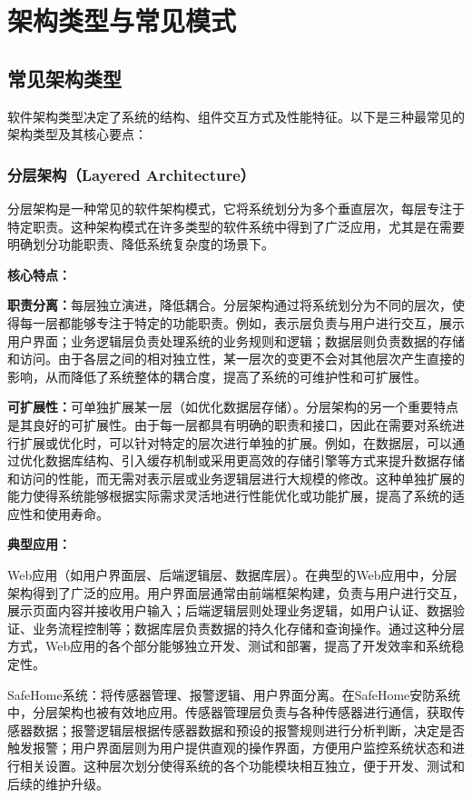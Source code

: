 \section{架构类型与常见模式}

\subsection{常见架构类型}

软件架构类型决定了系统的结构、组件交互方式及性能特征。以下是三种最常见的架构类型及其核心要点：

\subsubsection{分层架构（Layered Architecture）}

分层架构是一种常见的软件架构模式，它将系统划分为多个垂直层次，每层专注于特定职责。这种架构模式在许多类型的软件系统中得到了广泛应用，尤其是在需要明确划分功能职责、降低系统复杂度的场景下。

\textbf{核心特点：}

\textbf{职责分离：}每层独立演进，降低耦合。分层架构通过将系统划分为不同的层次，使得每一层都能够专注于特定的功能职责。例如，表示层负责与用户进行交互，展示用户界面；业务逻辑层负责处理系统的业务规则和逻辑；数据层则负责数据的存储和访问。由于各层之间的相对独立性，某一层次的变更不会对其他层次产生直接的影响，从而降低了系统整体的耦合度，提高了系统的可维护性和可扩展性。

\textbf{可扩展性：}可单独扩展某一层（如优化数据层存储）。分层架构的另一个重要特点是其良好的可扩展性。由于每一层都具有明确的职责和接口，因此在需要对系统进行扩展或优化时，可以针对特定的层次进行单独的扩展。例如，在数据层，可以通过优化数据库结构、引入缓存机制或采用更高效的存储引擎等方式来提升数据存储和访问的性能，而无需对表示层或业务逻辑层进行大规模的修改。这种单独扩展的能力使得系统能够根据实际需求灵活地进行性能优化或功能扩展，提高了系统的适应性和使用寿命。

\textbf{典型应用：}

Web应用（如用户界面层、后端逻辑层、数据库层）。在典型的Web应用中，分层架构得到了广泛的应用。用户界面层通常由前端框架构建，负责与用户进行交互，展示页面内容并接收用户输入；后端逻辑层则处理业务逻辑，如用户认证、数据验证、业务流程控制等；数据库层负责数据的持久化存储和查询操作。通过这种分层方式，Web应用的各个部分能够独立开发、测试和部署，提高了开发效率和系统稳定性。

SafeHome系统：将传感器管理、报警逻辑、用户界面分离。在SafeHome安防系统中，分层架构也被有效地应用。传感器管理层负责与各种传感器进行通信，获取传感器数据；报警逻辑层根据传感器数据和预设的报警规则进行分析判断，决定是否触发报警；用户界面层则为用户提供直观的操作界面，方便用户监控系统状态和进行相关设置。这种层次划分使得系统的各个功能模块相互独立，便于开发、测试和后续的维护升级。

